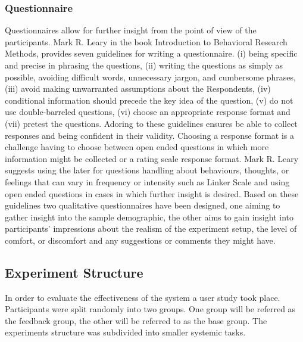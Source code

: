 \subsubsection{Questionnaire}
Questionnaires allow for further insight from the point of view of the participants. Mark R. Leary in the book Introduction to Behavioral Research Methods, provides seven guidelines for writing a questionnaire. (i) being specific and precise in phrasing the questions, (ii) writing the questions as simply as possible, avoiding difficult words, unnecessary jargon, and cumbersome phrases, (iii) avoid making unwarranted assumptions about the Respondents, (iv) conditional information should precede the key idea of the question, (v) do not use double-barreled questions, (vi) choose an appropriate response format and (vii) pretest the questions. Adoring to these guidelines ensures be able to collect responses and being confident in their validity. Choosing a response format is a challenge having to choose between open ended questions in which more information might be collected or a rating scale response format. Mark R. Leary suggests using the later for questions handling about behaviours, thoughts, or feelings that can vary in frequency or intensity such as Linker Scale\cite{likert1932technique} and using open ended questions in cases in which further insight is desired.
Based on these guidelines two qualitative questionnaires have been designed, one aiming to gather insight into the sample demographic, the other aims to gain insight into participants' impressions about the realism of the experiment setup, the level of comfort, or discomfort and any suggestions or comments they might have. 

\subsection{Experiment Structure}
In order to evaluate the effectiveness of the system a user study took place. Participants were split randomly into two groups. One group will be referred as the feedback group, the other will be referred to as the base group. The experiments structure was subdivided into smaller systemic tasks.

